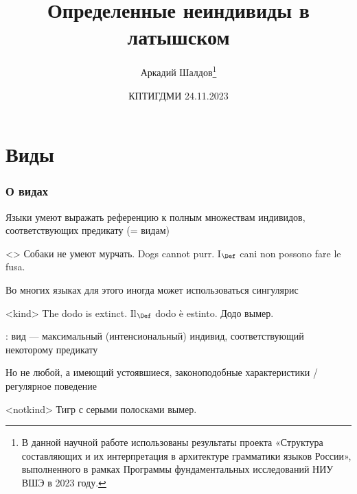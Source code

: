 \documentclass[9pt, t]{beamer}
\title{Определенные неиндивиды в латышском}
\author{Аркадий Шалдов\thanks{\tiny В данной научной работе использованы результаты проекта «Структура составляющих и их интерпретация в архитектуре грамматики языков России», выполненного в рамках Программы фундаментальных исследований НИУ ВШЭ в 2023 году.}}
\institute{НИУ ВШЭ, Формальная лаборатория}
\date{КПТИГДМИ 24.11.2023}
\begin{document}
    
    
    \begin{frame}
    \titlepage
    
\end{frame}

\section{Виды}
\begin{frame}
    \frametitle{О видах}

    Языки умеют выражать референцию к полным множествам индивидов, соответствующих предикату (= видам)

    \pex<>
        \a Собаки не умеют мурчать.
        \a Dogs cannot purr.
        \a I$_{\Def}$ cani non possono fare le fusa.
    \xe

    \pause
    Во многих языках для этого иногда может использоваться сингулярис

    \pex<kind>
        \a The dodo is extinct.
        \a Il$_{\Def}$ dodo è estinto.
        \a Додо вымер.
    \xe

    \pause
    \citep{chierchia1998}: вид — максимальный (интенсиональный) индивид, соответствующий некоторому предикату

    Но не любой, а имеющий устоявшиеся, законоподобные характеристики \citep{carlson1977,trugman2005} / регулярное поведение \citep{chierchia1998}
    
    \ex<notkind>
        \ljudge{*} Тигр с серыми полосками вымер.
    \xe

\end{frame}
\end{document}
